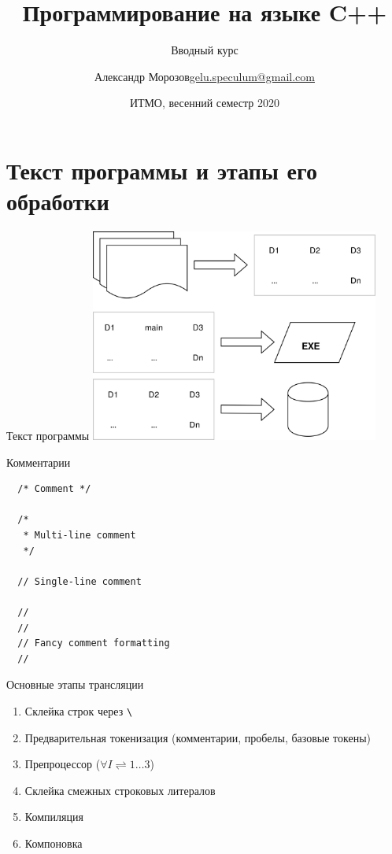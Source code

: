 \documentclass[unknownkeysallowed,xcolor=table]{beamer}
\title[C++]
{Программирование на языке C++}
\subtitle{Вводный курс}
\author[А.~Б.~Морозов]
{
  \texorpdfstring{Александр Морозов\newline\href{mailto:gelu.speculum@gmail.com}{gelu.speculum@gmail.com}}
  {Александр Морозов}
}
\date[ITMO 2020]
{ИТМО, весенний семестр 2020}
\begin{document}
 
\frame{\titlepage}

\section{Текст программы и этапы его обработки}

\begin{frame}{Текст программы}
  \includegraphics[align=c,width=9.5cm,keepaspectratio]{images/text_decl_bin.png}
\end{frame}

\begin{frame}[fragile]{Комментарии}
  \begin{lstlisting}
  /* Comment */

  /*
   * Multi-line comment
   */

  // Single-line comment

  //
  //
  // Fancy comment formatting
  //
  \end{lstlisting}
\end{frame}

\begin{frame}[fragile]{Основные этапы трансляции}
  \begin{enumerate}
    \item Склейка строк через \lstinline{\} \vspace{1em}
    \item Предварительная токенизация (комментарии, пробелы, базовые токены) \vspace{1em}
    \item Препроцессор ($\forall I \rightleftharpoons 1\dotso3$) \vspace{1em}
    \item Склейка смежных строковых литералов \vspace{1em}
    \item Компиляция \vspace{1em}
    \item Компоновка
  \end{enumerate}
\end{frame}
\end{document}
